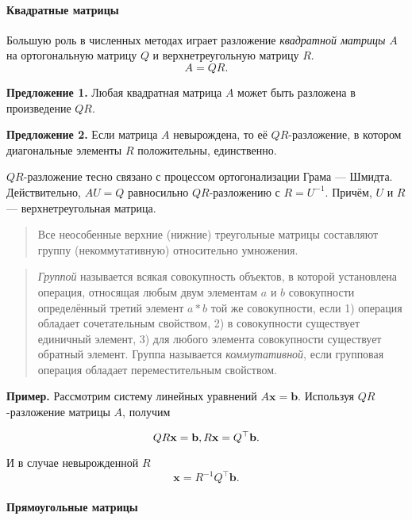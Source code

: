 \documentclass[11pt,a4paper]{article}
\begin{document}
\hypertarget{ux43aux432ux430ux434ux440ux430ux442ux43dux44bux435-ux43cux430ux442ux440ux438ux446ux44b}{%
\paragraph{Квадратные
матрицы}\label{ux43aux432ux430ux434ux440ux430ux442ux43dux44bux435-ux43cux430ux442ux440ux438ux446ux44b}}

Большую роль в численных методах играет разложение \emph{квадратной
матрицы} \(A\) на ортогональную матрицу \(Q\) и верхнетреугольную
матрицу \(R\). \[
  A = QR.
\]

\textbf{Предложение 1.} Любая квадратная матрица \(A\) может быть
разложена в произведение \(QR\).

\textbf{Предложение 2.} Если матрица \(A\) невырождена, то её
\(QR\)-разложение, в котором диагональные элементы \(R\) положительны,
единственно.

\(QR\)-разложение тесно связано с процессом ортогонализации Грама ---
Шмидта. Действительно, \(AU = Q\) равносильно \(QR\)-разложению с
\(R = U^{-1}\). Причём, \(U\) и \(R\) --- верхнетреугольная матрица.

\begin{quote}
Все неособенные верхние (нижние) треугольные матрицы составляют группу
(некоммутативную) относительно умножения.
\end{quote}

\begin{quote}
\emph{Группой} называется всякая совокупность объектов, в которой
установлена операция, относящая любым двум элементам \(a\) и \(b\)
совокупности определённый третий элемент \(a \ast b\) той же
совокупности, если 1) операция обладает сочетательным свойством, 2) в
совокупности существует единичный элемент, 3) для любого элемента
совокупности существует обратный элемент. Группа называется
\emph{коммутативной}, если групповая операция обладает переместительным
свойством.
\end{quote}

\textbf{Пример.} Рассмотрим систему линейных уравнений
\(A\mathbf{x} = \mathbf{b}\). Используя \(QR\)-разложение матрицы \(A\),
получим

\[
  QR \mathbf{x} = \mathbf{b}, \\
  R \mathbf{x} = Q^\top \mathbf{b}.
\]

И в случае невырожденной \(R\) \[
  \mathbf{x} = R^{-1}Q^\top \mathbf{b}.
\]

    \hypertarget{ux43fux440ux44fux43cux43eux443ux433ux43eux43bux44cux43dux44bux435-ux43cux430ux442ux440ux438ux446ux44b}{%
\paragraph{Прямоугольные
матрицы}\label{ux43fux440ux44fux43cux43eux443ux433ux43eux43bux44cux43dux44bux435-ux43cux430ux442ux440ux438ux446ux44b}}
\end{document}
